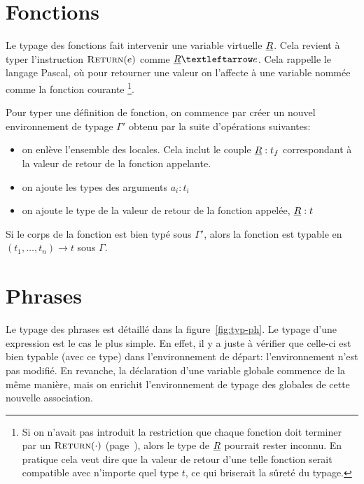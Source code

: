 \begin{mathpar}

\end{mathpar}

\section{Fonctions}

Le typage des fonctions fait intervenir une variable virtuelle $\vRet$. Cela
revient à typer l'instruction $\iReturn{e}$ comme $\vRet ← e$. Cela rappelle le
langage Pascal, où pour retourner une valeur on l'affecte à une variable nommée
comme la fonction courante
\footnote{
    Si on n'avait pas introduit la restriction que chaque fonction doit terminer
    par un $\iReturn{\cdot}$ (page~\pageref{page:return-fonction}), alors le type de
    $\vRet$ pourrait rester inconnu. En pratique cela veut dire que la valeur de
    retour d'une telle fonction serait compatible avec n'importe quel type $t$, ce
    qui briserait la sûreté du typage.
}.

\begin{mathpar}
\end{mathpar}

Pour typer une définition de fonction, on commence par créer un nouvel
environnement de typage $Γ'$ obtenu par la suite d'opérations suivantes:

\begin{itemize}
\item
  on enlève l'ensemble des locales. Cela inclut le couple $\vRet : t_f$
  correspondant à la valeur de retour de la fonction appelante.
\item
  on ajoute les types des arguments $a_i : t_i$
\item
  on ajoute le type de la valeur de retour de la fonction appelée,
  $\vRet : t$
\end{itemize}

Si le corps de la fonction est bien typé sous $Γ'$, alors la fonction est
typable en $(t_1, …, t_n) → t$ sous $Γ$.

\begin{mathpar}
\end{mathpar}

\section{Phrases}

Le typage des phrases est détaillé dans la figure~\ref{fig:typ-ph}. Le typage
d'une expression est le cas le plus simple. En effet, il y a juste à vérifier
que celle-ci est bien typable (avec ce type) dans l'environnement de départ:
l'environnement n'est pas modifié. En revanche, la déclaration d'une variable
globale commence de la même manière, mais on enrichit l'environnement de typage
des globales de cette nouvelle association.


